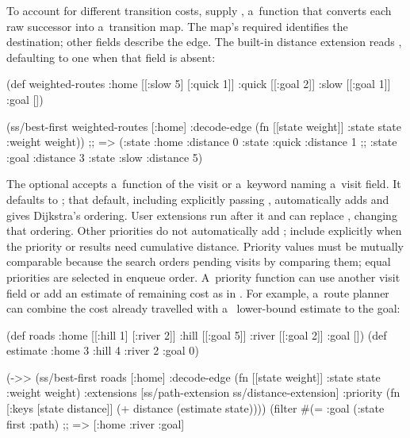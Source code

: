 To account for different transition costs, supply ,
a~function that converts each raw successor into a~transition map.
The map's required  identifies the destination; other fields
describe the edge. The built-in distance extension reads ,
defaulting to one when that field is absent:

\begtt {}
(def weighted-routes
  {:home [[:slow 5] [:quick 1]]
   :quick [[:goal 2]]
   :slow [[:goal 1]]
   :goal []})

(ss/best-first weighted-routes [:home]
               {:decode-edge (fn [[state weight]]
                               {:state state :weight weight})})
;; => ({:state :home :distance 0} {:state :quick :distance 1}
;;     {:state :goal :distance 3} {:state :slow :distance 5})
\endtt

The optional  accepts a~function of the visit or a~keyword
naming a~visit field. It defaults to ; that default, including
explicitly passing , automatically adds
 and gives Dijkstra's ordering. User extensions run
after it and can replace , changing that ordering. Other
priorities do not automatically add ; include
 explicitly when the priority or results need
cumulative distance. Priority values must be mutually comparable because the
search orders pending visits by comparing them; equal priorities are selected
in enqueue order. A~priority function can use another visit field or add an
estimate of remaining cost as in
. For
example, a~route planner can combine the cost already travelled with a~
lower-bound estimate to the goal:

\begtt {}
(def roads {:home [[:hill 1] [:river 2]]
            :hill [[:goal 5]]
            :river [[:goal 2]]
            :goal []})
(def estimate {:home 3 :hill 4 :river 2 :goal 0})

(->> (ss/best-first roads [:home]
                        {:decode-edge (fn [[state weight]]
                                        {:state state :weight weight})
                         :extensions [ss/path-extension
                                      ss/distance-extension]
                         :priority (fn [{:keys [state distance]}]
                                     (+ distance (estimate state)))})
     (filter #(= :goal (:state %
     first
     :path)
;; => [:home :river :goal]
\endtt

